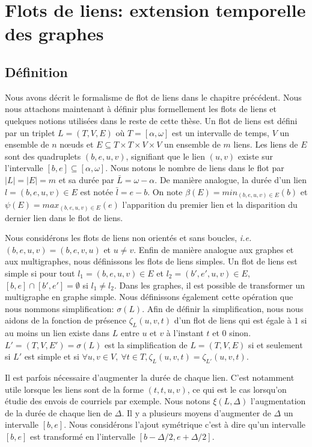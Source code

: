 \chapter{Flots de liens: extension temporelle des graphes}
\minitoc
\label{chap:def_flot}

\section{Définition}
\label{sec:definition}

Nous avons décrit le formalisme de flot de liens dans le chapitre précédent.
Nous nous attachons maintenant à définir plus formellement les flots de liens et quelques notions utilisées dans le reste de cette thèse.
Un flot de liens est défini par un triplet $L=(T,V,E)$ où $T=[\alpha, \omega]$ est un intervalle de temps, $V$ un ensemble de $n$ n\oe{}uds et $E\subseteq T\times T \times V \times V$ un ensemble de $m$ liens.
Les liens de $E$ sont des quadruplets $(b,e,u,v)$, signifiant que le lien $(u, v)$ existe sur l'intervalle $[b,e] \subseteq [\alpha,\omega]$.
Nous notons le nombre de liens dans le flot par $|L|=|E|=m$ et sa durée par $\bar{L}=\omega-\alpha$.
De manière analogue, la durée d'un lien $l=(b,e,u,v) \in E$ est notée   $\bar{l}=e-b$.
On note $\beta(E)= min_{(b,e,u,v) \in E} (b)$ et $\psi(E)= max_{(b,e,u,v) \in E} (e)$ l'apparition du premier lien et la disparition du dernier lien dans le flot de liens.

Nous considérons les flots de liens non orientés et sans boucles, \emph{i.e.}$(b,e,u,v)=(b,e,v,u)$ et $u \neq v$.
Enfin de manière analogue aux graphes et aux multigraphes, nous définissons les flots de liens simples.
Un flot de liens est simple si pour tout $l_1=(b,e,u,v) \in E$ et $l_2=(b',e',u, v) \in E$, $[b,e]\cap [b', e'] = \emptyset$ si $l_1 \neq l_2$.
Dans les graphes, il est possible de transformer un multigraphe en graphe simple.
Nous définissons également cette opération que nous nommons simplification: $\sigma(L)$.
Afin de définir la simplification, nous nous aidons de la fonction de présence $\zeta_{L}(u,v,t)$ d'un flot de liens qui est égale à $1$ si au moins un lien existe dans $L$ entre $u$ et $v$ à l'instant $t$ et $0$ sinon.
$L'=(T,V,E')= \sigma(L)$ est la simplification de $L=(T,V,E)$ si et seulement si $L'$ est simple et si $\forall u,v \in V,\ \forall t\in T, \zeta_{L}(u,v,t)= \zeta_{L'}(u,v,t)$.

Il est parfois nécessaire d'augmenter la durée de chaque lien.
C'est notamment utile lorsque les liens sont de la forme $(t,t,u,v)$, ce qui est le cas lorsqu'on étudie des envois de courriels par exemple.
Nous notons $\xi(L,\Delta)$ l'augmentation de la durée de chaque lien de $\Delta$.
Il y a plusieurs moyens d'augmenter de $\Delta$ un intervalle $[b,e]$.
Nous considérons l'ajout symétrique c'est à dire qu'un intervalle $[b,e]$ est transformé en l'intervalle $[b-\Delta/2,e+\Delta/2]$.

